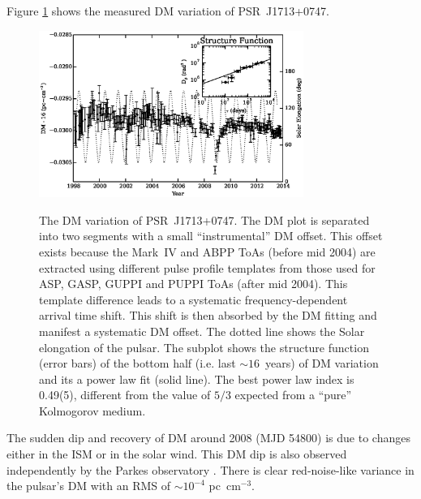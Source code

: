 
Figure \ref{fig:dmx} shows the measured DM variation of PSR~J1713+0747.
%
\begin{figure}
\includegraphics[width=3.4in]{DMX.ps} \\ 
\caption {\label{fig:dmx} The DM variation of PSR~J1713+0747. The DM plot is
separated into two segments with a small ``instrumental'' DM offset. This offset exists 
because the Mark~IV and ABPP ToAs (before mid 2004) are extracted using
different pulse
profile templates from those used for ASP, GASP, GUPPI and PUPPI ToAs (after
mid 2004). This template difference leads to a systematic
frequency-dependent arrival time shift. This shift is then absorbed by the DM
fitting and manifest a systematic DM offset. The dotted line shows the Solar
elongation of the pulsar. The subplot shows the structure
function (error bars) of the bottom half (i.e. last $\sim 16$~years) of DM
variation and its a power law fit (solid line). The best power law index is
0.49(5), different from the value of $5/3$ expected from a
``pure'' Kolmogorov medium. } 
\end{figure} 
%
The sudden dip and recovery of DM around 2008 (MJD 54800) is 
due to changes either in the ISM or in the solar wind. This DM dip is also
observed independently by the Parkes observatory \citep{kcs+13}.
There is clear red-noise-like variance in the pulsar's DM with an RMS of
$\sim10^{-4}$ pc~cm$^{-3}$. 


